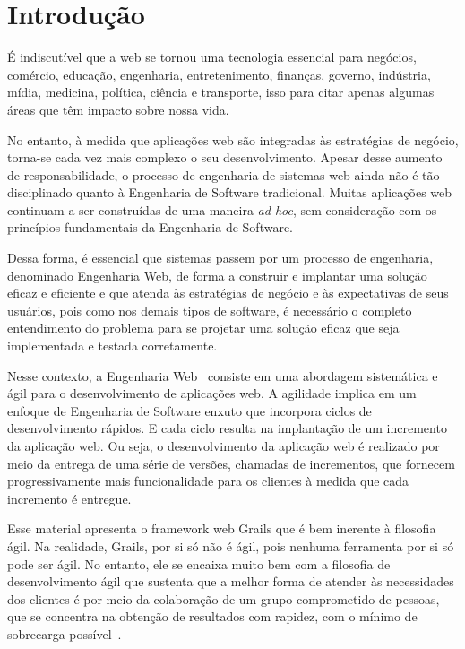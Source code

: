 \chapter{Introdução}

É  indiscutível que  a web  se tornou  uma tecnologia  essencial  para negócios,
comércio,  educação, engenharia,  entretenimento, finanças,  governo, indústria,
mídia, medicina, política, ciência e  transporte, isso para citar apenas algumas
áreas que têm impacto sobre nossa vida.

No  entanto,  à medida  que  aplicações web  são  integradas  às estratégias  de
negócio, torna-se  cada vez mais  complexo o seu desenvolvimento.   Apesar desse
aumento de responsabilidade, o processo  de engenharia de sistemas web ainda não
é  tão  disciplinado  quanto  à  Engenharia  de  Software  tradicional.   Muitas
aplicações web  continuam a  ser construídas  de uma maneira  {\it ad  hoc}, sem
consideração com os princípios fundamentais da Engenharia de Software.

Dessa  forma, é essencial  que sistemas  passem por  um processo  de engenharia,
denominado Engenharia Web, de forma a construir e implantar uma solução eficaz e
eficiente  e que  atenda às  estratégias de  negócio e  às expectativas  de seus
usuários,  pois como  nos  demais tipos  de  software, é  necessário o  completo
entendimento  do  problema  para  se   projetar  uma  solução  eficaz  que  seja
implementada e testada corretamente.

Nesse contexto, a  Engenharia Web~\cite{Bed12, Pressman09}
consiste  em  uma  abordagem  sistemática  e  ágil  para  o  desenvolvimento  de
aplicações  web. A agilidade  implica em  um enfoque  de Engenharia  de Software
enxuto que incorpora ciclos de  desenvolvimento rápidos. E cada ciclo resulta na
implantação de  um incremento da aplicação  web.  Ou seja,  o desenvolvimento da
aplicação web é realizado por meio  da entrega de uma série de versões, chamadas
de  incrementos,  que  fornecem  progressivamente mais  funcionalidade  para  os
clientes à medida que cada incremento é entregue.

Esse material  apresenta o framework web  Grails que é bem  inerente à filosofia
ágil. Na realidade, Grails, por si só não é ágil, pois nenhuma ferramenta por si
só  pode ser  ágil. No  entanto, ele  se encaixa  muito bem  com a  filosofia de
desenvolvimento ágil que sustenta que  a melhor forma de atender às necessidades
dos clientes é por meio da  colaboração de um grupo comprometido de pessoas, que
se concentra na  obtenção de resultados com rapidez, com  o mínimo de sobrecarga
possível~\cite{BA04, Schwaber04}.

